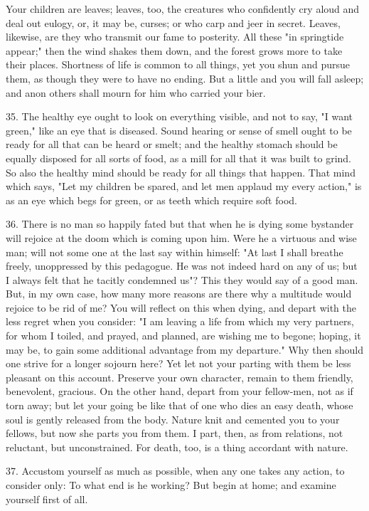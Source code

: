 \documentclass{book}
\begin{document}
Your children are leaves; leaves, too, the creatures who confidently
cry aloud and deal out eulogy, or, it may be, curses; or who carp and
jeer in secret. Leaves, likewise, are they who transmit our fame to
posterity. All these "in springtide appear;" then the wind shakes them
down, and the forest grows more to take their places. Shortness of
life is common to all things, yet you shun and pursue them, as though
they were to have no ending. But a little and you will fall asleep;
and anon others shall mourn for him who carried your bier.

35. The healthy eye ought to look on everything visible, and not to
say, "I want green," like an eye that is diseased. Sound hearing or
sense of smell ought to be ready for all that can be heard or smelt;
and the healthy stomach should be equally disposed for all sorts of
food, as a mill for all that it was built to grind. So also the
healthy mind should be ready for all things that happen. That mind
which says, "Let my children be spared, and let men applaud my every
action," is as an eye which begs for green, or as teeth which require
soft food.

36. There is no man so happily fated but that when he is dying some
bystander will rejoice at the doom which is coming upon him. Were he a
virtuous and wise man; will not some one at the last say within
himself: "At last I shall breathe freely, unoppressed by this
pedagogue. He was not indeed hard on any of us; but I always felt that
he tacitly condemned us"? This they would say of a good man. But, in
my own case, how many more reasons are there why a multitude would
rejoice to be rid of me? You will reflect on this when dying, and
depart with the less regret when you consider: "I am leaving a life
from which my very partners, for whom I toiled, and prayed, and
planned, are wishing me to begone; hoping, it may be, to gain some
additional advantage from my departure." Why then should one strive
for a longer sojourn here? Yet let not your parting with them be less
pleasant on this account. Preserve your own character, remain to them
friendly, benevolent, gracious. On the other hand, depart from your
fellow-men, not as if torn away; but let your going be like that of
one who dies an easy death, whose soul is gently released from the
body. Nature knit and cemented you to your fellows, but now she parts
you from them. I part, then, as from relations, not reluctant, but
unconstrained. For death, too, is a thing accordant with nature.

37. Accustom yourself as much as possible, when any one takes any
action, to consider only: To what end is he working? But begin at
home; and examine yourself first of all.
\end{document}
